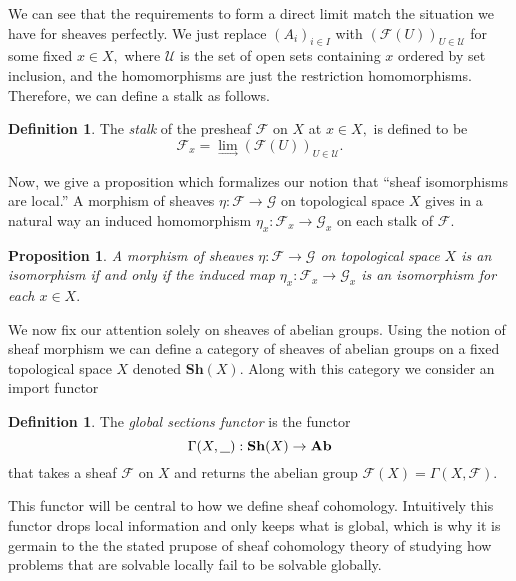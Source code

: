 \documentclass[psamsfonts]{amsart}
\newtheorem{prop}[thm]{Proposition}
\theoremstyle{definition}
\newtheorem{defn}[thm]{Definition}
\theoremstyle{remark}
\numberwithin{equation}{section}
\begin{document}
  We can see that the requirements to form a direct limit match the situation we have for sheaves perfectly. We just replace $(A_i)_{i \in I}$ with $(\mathscr{F}(U))_{U \in \mathscr{U}}$ for some fixed $x \in X,$ where $\mathscr{U}$ is the set of open sets containing $x$ ordered by set inclusion, and the homomorphisms are just the restriction homomorphisms. Therefore, we can define a stalk as follows.

  \begin{defn}
    The \textit{stalk} of the presheaf $\mathscr{F}$ on $X$ at $x \in X,$ is defined to be 
    \[\mathscr{F}_x = \lim_{\longrightarrow}(\mathscr{F}(U))_{U \in \mathscr{U}}.\]
  \end{defn}

  Now, we give a proposition which formalizes our notion that ``sheaf isomorphisms are local.'' A morphism of sheaves $\eta: \mathscr{F} \to \mathscr{G}$ on topological space $X$ gives in a natural way an induced homomorphism $\eta_x: \mathscr{F}_x \to \mathscr{G}_x$ on each stalk of $\mathscr{F}.$

  \begin{prop}
    A morphism of sheaves $\eta: \mathscr{F} \to \mathscr{G}$ on topological space $X$ is an isomorphism if and only if the induced map $\eta_x: \mathscr{F}_x \to \mathscr{G}_x$ is an isomorphism for each $x \in X.$ \cite{hartshorne_1977}
  \end{prop}

  We now fix our attention solely on sheaves of abelian groups. Using the notion of sheaf morphism we can define a category of sheaves of abelian groups on a fixed topological space $X$ denoted $\textbf{Sh}(X).$ Along with this category we consider an import functor 

  \begin{defn}
    The \textit{global sections functor} is the functor 
    \[\Gamma(X,\underline{\hspace{.25cm}}): \textbf{Sh}(X) \to \textbf{Ab}\]
    that takes a sheaf $\mathscr{F}$ on $X$ and returns the abelian group $\mathscr{F}(X) = \Gamma(X,\mathscr{F}).$ 
  \end{defn}

  This functor will be central to how we define sheaf cohomology. Intuitively this functor drops local information and only keeps what is global, which is why it is germain to the the stated prupose of sheaf cohomology theory of studying how problems that are solvable locally fail to be solvable globally.
\end{document}

